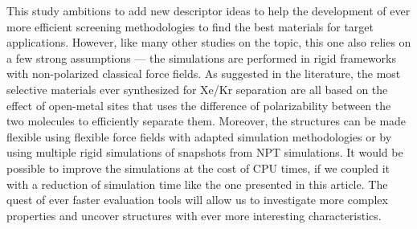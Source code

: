 \documentclass[main]{subfiles}
\begin{document}
This study ambitions to add new descriptor ideas to help the development of ever more efficient screening methodologies to find the best materials for target applications. However, like many other studies on the topic, this one also relies on a few strong assumptions --- the simulations are performed in rigid frameworks with non-polarized classical force fields. As suggested in the literature, the most selective materials ever synthesized for Xe/Kr separation are all based on the effect of open-metal sites that uses the difference of polarizability between the two molecules to efficiently separate them.\cite{Li_2019, Pei_2022} Moreover, the structures can be made flexible using flexible force fields with adapted simulation methodologies\cite{Bousquet2012} or by using multiple rigid simulations of snapshots from NPT simulations\cite{Witman_2017}.
It would be possible to improve the simulations at the cost of CPU times, if we coupled it with a reduction of simulation time like the one presented in this article. The quest of ever faster evaluation tools will allow us to investigate more complex properties and uncover structures with ever more interesting characteristics.

\OnlyInSubfile{\printglobalbibliography}
\end{document}
